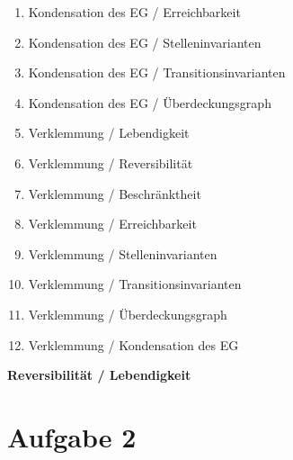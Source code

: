 \documentclass[10pt]{scrartcl}
\begin{document}
\begin{enumerate}
\item{Kondensation des EG  / Erreichbarkeit}\\

\item{Kondensation des EG  / Stelleninvarianten}\\

\item{Kondensation des EG  / Transitionsinvarianten}\\

\item{Kondensation des EG  / Überdeckungsgraph}\\

\item{Verklemmung / Lebendigkeit}\\

\item{Verklemmung / Reversibilität}\\

\item{Verklemmung / Beschränktheit}\\

\item{Verklemmung / Erreichbarkeit}\\

\item{Verklemmung / Stelleninvarianten}\\

\item{Verklemmung / Transitionsinvarianten}\\

\item{Verklemmung / Überdeckungsgraph}\\

\item{Verklemmung / Kondensation des EG}\\

\end{enumerate}
\textbf{Reversibilität / Lebendigkeit}


\section{Aufgabe 2}
\end{document}
